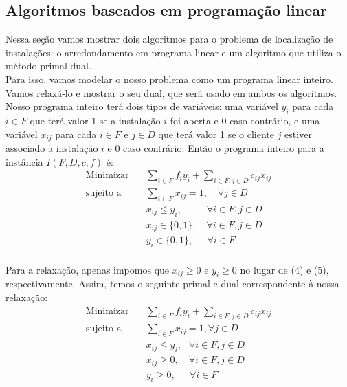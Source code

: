 \documentclass[12pt]{article}
\begin{document}
\subsection{Algoritmos baseados em programação linear}
Nessa seção vamos mostrar dois algoritmos para o problema de localização de instalações: o arredondamento em programa linear e um algoritmo que utiliza o método primal-dual. \\
Para isso, vamos modelar o nosso problema como um programa linear inteiro. Vamos relaxá-lo e mostrar o seu dual, que será usado em ambos os algoritmos. \\
Nosso programa inteiro terá dois tipos de variáveis: uma variável $y_i$ para cada $i \in F$ que terá valor 1 se a instalação $i$ foi aberta e 0 caso contrário, e uma variável $x_{ij}$ para cada $i \in F$ e $j \in D$ que terá valor 1 se o cliente $j$ estiver associado a instalação $i$ e 0 caso contrário. Então o programa inteiro para a instância $I(F,D,c,f)$ é:
\begin{align}
 \text{Minimizar} \quad & \sum_{i \in F}f_iy_i + \sum_{i\in F,j\in D}c_{ij}x_{ij} \\
 \text{sujeito a} \quad & \sum_{i\in F} x_{ij}=1, \quad \forall j \in D \\
 &x_{ij} \leq y_i,\quad \quad \; \; \forall i\in F,j\in D\\
 &x_{ij} \in \{0,1\} ,\quad \forall i\in F,j\in D\\
 &y_i \in \{0,1\}, \quad \; \,\forall i\in F.
\end{align}
\\
Para a relaxação, apenas impomos que $x_{ij} \geq 0$ e $y_i \geq 0$ no lugar de (4) e (5), respectivamente. Assim, temos o seguinte primal e dual correspondente à nossa relaxação:
    \begin{align}
        \text{Minimizar} \quad & \sum_{i \in F}f_iy_i + \sum_{i\in F,j\in D}c_{ij}x_{ij} \tag{P1} \label{P1}\\
        \text{sujeito a} \quad & \sum_{i\in F} x_{ij}=1,  \forall j \in D \tag{P2} \label{P2}\\
        &x_{ij} \leq y_i, \, \; \; \forall i\in F,j\in D \tag{P3} \label{P3}\\
        &x_{ij} \geq 0,\quad \forall i\in F,j\in D\tag{P4}\label{P4}\\
        &y_i \geq 0, \quad \; \,\forall i\in F \tag{P5} \label{P5}
       \end{align}
\end{document}
